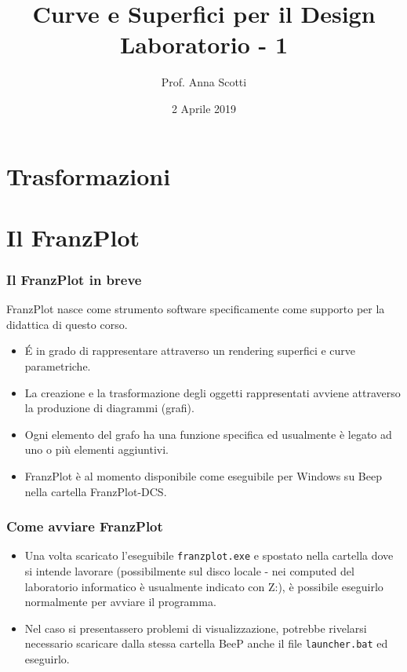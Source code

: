\documentclass{beamer}
\title[Curve e Sup. - Lab 1]{Curve e Superfici per il Design \\ Laboratorio - 1}
\author[Prof. Scotti]{Prof. Anna Scotti}
\date{2 Aprile 2019}
\newcommand{\frnzplt}{FranzPlot }
\begin{document}
\begin{frame}
\maketitle
\end{frame}
\section{Trasformazioni}

\section{Il \frnzplt}
\begin{frame}
\frametitle{Il \frnzplt in breve}
\frnzplt nasce come strumento software specificamente come supporto per la didattica di questo corso.
\begin{itemize}
  \item \'E in grado di rappresentare attraverso un rendering superfici e curve parametriche.
  \item La creazione e la trasformazione degli oggetti rappresentati avviene attraverso la produzione di diagrammi (grafi).
  \item Ogni elemento del grafo ha una funzione specifica ed usualmente \`e legato ad uno o pi\`u elementi aggiuntivi.
\item \frnzplt \`e al momento disponibile come eseguibile per Windows su Beep nella cartella FranzPlot-DCS. 
\end{itemize}
\end{frame}
\begin{frame}
\frametitle{Come avviare \frnzplt}
\begin{itemize}
\item Una volta scaricato l'eseguibile \texttt{franzplot.exe} e spostato nella
cartella dove si intende lavorare (possibilmente sul disco locale - nei
computed del laboratorio informatico \`e usualmente indicato con Z:), \`e
possibile eseguirlo normalmente per avviare il programma.  
\item Nel caso si
presentassero problemi di visualizzazione, potrebbe rivelarsi necessario
scaricare dalla stessa cartella BeeP anche il file \texttt{launcher.bat} ed eseguirlo.
\end{itemize}
\end{frame}
\end{document}
